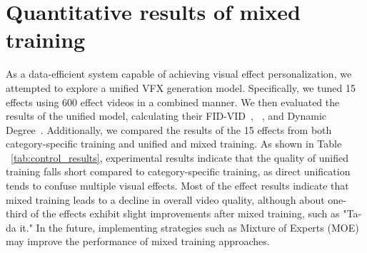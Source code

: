 \section{Quantitative results of mixed training}
As a data-efficient system capable of achieving visual effect personalization, we attempted to explore a unified VFX generation model. Specifically, we tuned 15 effects using 600 effect videos in a combined manner. We then evaluated the results of the unified model, calculating their FID-VID~\cite{unterthiner2018towards}, ~\cite{balaji2019conditional}, and Dynamic Degree~\cite{huang2024vbench}. Additionally, we compared the results of the 15 effects from both category-specific training and unified and mixed training. As shown in Table ~\ref{tab:control_results}, experimental results indicate that the quality of unified training falls short compared to category-specific training, as direct unification tends to confuse multiple visual effects. Most of the effect results indicate that mixed training leads to a decline in overall video quality, although about one-third of the effects exhibit slight improvements after mixed training, such as "Ta-da it." In the future, implementing strategies such as Mixture of Experts (MOE)~\cite{chen2022understandingmixtureexpertsdeep} may improve the performance of mixed training approaches.

